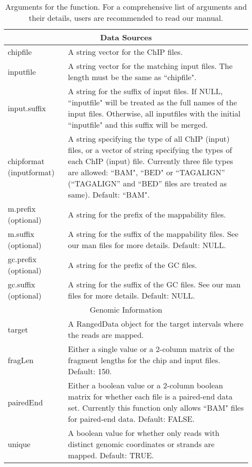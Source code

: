 \documentclass[a4paper,10pt]{article}\usepackage[]{graphicx}\usepackage[]{color}
\begin{document}
\begin{table}
  \centering
  \caption{Arguments for the  function. For a comprehensive list of arguments and their details, users are recommended to read our manual.}\label{tbl:arguments}
  \begin{tabular}{p{2cm}p{10cm}}
    \hline
    \multicolumn{2}{c}{Data Sources}\\
    \hline
    chipfile & A string vector for the ChIP files.\\
    inputfile & A string vector for the matching input files. The length must be the same as ``chipfile".\\
    input.suffix & A string for the suffix of input files. If NULL, ``inputfile" will be treated as the full names of the input files. Otherwise, all inputfiles with the initial ``inputfile" and this suffix will be merged.\\
    chipformat (inputformat) & A string specifying the type of all ChIP (input) files, or a vector of string specifying the types of each ChIP (input) file.  Currently three file types are allowed: ``BAM", ``BED" or ``TAGALIGN'' (``TAGALIGN'' and ``BED'' files are treated as same).  Default: ``BAM".\\
    m.prefix (optional) & A string for the prefix of the mappability files.\\
    m.suffix (optional) & A string for the suffix of the mappability files. See our man files for more details.  Default: NULL.\\
    gc.prefix (optional) & A string for the prefix of the GC files.\\
    gc.suffix (optional) & A string for the suffix of the GC files.  See our man files for more details. Default: NULL.\\
    \hline
    \multicolumn{2}{c}{Genomic Information}\\
    \hline
    target & A RangedData object for the target intervals where the reads are mapped.\\
    fragLen & Either a single value or a 2-column matrix of the fragment lengths for the chip and input files.  Default: 150.\\
    pairedEnd & Either a boolean value or a 2-column boolean matrix for  whether each file is a paired-end data set. Currently this function only allows ``BAM" files for paired-end data. Default: FALSE.\\
    unique & A boolean value for whether only reads with distinct genomic coordinates or strands are mapped.  Default: TRUE.\\

\end{tabular}
\end{table}
\end{document}
